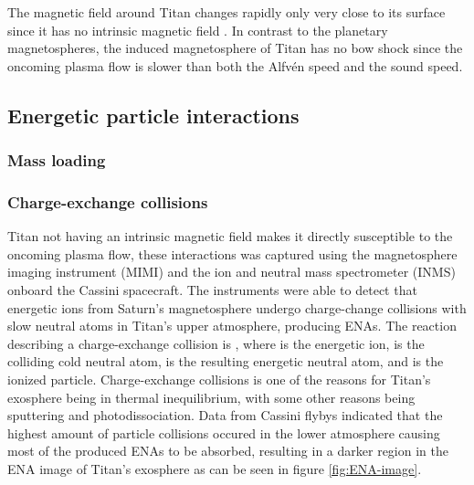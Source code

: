\documentclass[12pt, parskip=full*, abstract]{scrartcl}
\begin{document}

The magnetic field around Titan changes rapidly only very close to its surface since it has no intrinsic magnetic field \parencite{encyclopedia}. In contrast to the planetary magnetospheres, the induced magnetosphere of Titan has no bow shock since the oncoming plasma flow is slower than both the Alfvén speed and the sound speed. 




\subsection{Energetic particle interactions}

\subsubsection{Mass loading}

\subsubsection{Charge-exchange collisions}
\parencite{titan-exosphere-interaction}
Titan not having an intrinsic magnetic field makes it directly susceptible to the oncoming plasma flow, these interactions was captured using the magnetosphere imaging instrument (MIMI) and the ion and neutral mass spectrometer (INMS) onboard the Cassini spacecraft. The instruments were able to detect that energetic ions from Saturn's magnetosphere undergo charge-change collisions with slow neutral atoms in Titan's upper atmosphere, producing ENAs. The reaction describing a charge-exchange collision is , where  is the energetic ion,  is the colliding cold neutral atom,  is the resulting energetic neutral atom, and  is the ionized particle. Charge-exchange collisions is one of the reasons for Titan's exosphere being in thermal inequilibrium, with some other reasons being sputtering and photodissociation. Data from Cassini flybys indicated that the highest amount of particle collisions occured in the lower atmosphere causing most of the produced ENAs to be absorbed, resulting in a darker region in the ENA image of Titan's exosphere as can be seen in figure \ref{fig:ENA-image}.
\end{document}
